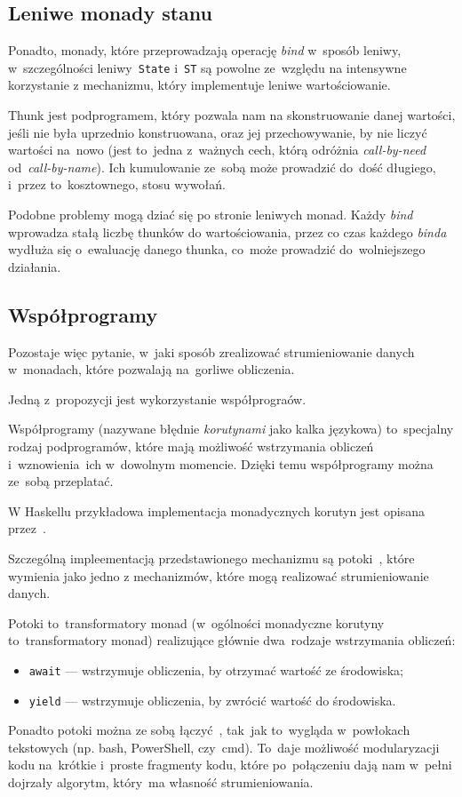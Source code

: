 \documentclass[../../praca.tex]{subfiles}
\begin{document}
\subsection{Leniwe monady stanu}

Ponadto, monady, które przeprowadzają operację \emph{bind} w~sposób leniwy,
w~szczególności leniwy~\texttt{State} i~\texttt{ST} są powolne ze~względu
na intensywne korzystanie z mechanizmu, który implementuje leniwe wartościowanie.

Thunk jest podprogramem, który pozwala nam na skonstruowanie danej wartości,
jeśli nie była uprzednio konstruowana, oraz jej przechowywanie, by nie
liczyć wartości na~nowo (jest to~jedna z~ważnych cech, którą odróżnia \emph{call-by-need}
od~\emph{call-by-name}). Ich kumulowanie ze~sobą może prowadzić do~dość długiego,
i~przez to~kosztownego, stosu wywołań. 

Podobne problemy mogą dziać się po stronie leniwych monad. Każdy \emph{bind}
wprowadza stałą liczbę thunków do wartościowania, przez co czas każdego \emph{binda}
wydłuża się o~ewaluację danego thunka, co~może prowadzić do~wolniejszego działania.

\subsection{Współprogramy}

Pozostaje więc pytanie, w~jaki sposób zrealizować strumieniowanie danych
w~monadach, które pozwalają na~gorliwe obliczenia.

Jedną z~propozycji jest wykorzystanie współprograów.

Współprogramy (nazywane błędnie \emph{korutynami} jako kalka językowa)
to~specjalny rodzaj podprogramów, które mają możliwość wstrzymania obliczeń
i~wznowienia~ich w~dowolnym momencie. Dzięki temu współprogramy można ze~sobą
przeplatać.

W Haskellu przykładowa implementacja monadycznych korutyn jest opisana 
przez~\cite{Blazevic:CP}.

Szczególną impleementacją przedstawionego mechanizmu są potoki~\cite{Blazevic:CP},
które~\cite{Thomasson:HHPP} wymienia jako jedno z mechanizmów, które mogą realizować
strumieniowanie danych.

Potoki to~transformatory monad (w~ogólności monadyczne korutyny to~transformatory monad)
realizujące głównie dwa~rodzaje wstrzymania obliczeń:
\begin{itemize}
  \item \texttt{await} --- wstrzymuje obliczenia, by otrzymać wartość ze środowiska;
  \item \texttt{yield} --- wstrzymuje obliczenia, by zwrócić wartość do środowiska.
\end{itemize}
Ponadto potoki można ze sobą łączyć~\cite{Blazevic:CP}, tak~jak to~wygląda 
w~powłokach tekstowych (np. bash, PowerShell, czy~cmd). To~daje możliwość
modularyzacji kodu na~krótkie i~proste fragmenty kodu, które po~połączeniu dają
nam w~pełni dojrzały algorytm, który~ma własność strumieniowania.
\end{document}
